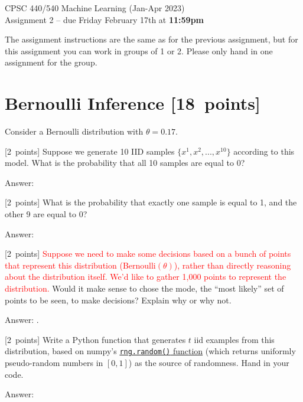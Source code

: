 \documentclass{article}
\newcommand{\ask}[1]{\textcolor{question}{#1}}
\newenvironment{answer}{\par\begingroup\color{answer}Answer: }{\endgroup}
\newcommand{\red}[1]{\textcolor{red}{#1}}
\newcommand{\pts}[1]{\textcolor{points}{[#1~points]}}
\newcommand{\TODO}{\color{red}{TODO}}
\begin{document}
\begin{center}
\Large
CPSC 440/540 Machine Learning (Jan-Apr 2023)\\
Assignment 2 --
due Friday February 17th at \textbf{11:59pm}
\end{center}


The assignment instructions are the same as for the previous assignment, but for this assignment you can work in groups of 1 or 2. Please only hand in one assignment for the group.


\section{Bernoulli Inference \pts{18}}

Consider a Bernoulli distribution with $\theta = 0.17$.
\begin{qlist}

\item \pts{2}
    Suppose we generate 10 IID samples $\{x^1,x^2,...,x^{10}\}$ according to this model.
    \ask{What is the probability that all 10 samples are equal to 0?}

\begin{answer}\TODO\end{answer}


\item \pts{2}
    \ask{What is the probability that exactly one sample is equal to 1, and the other 9 are equal to 0?}

\begin{answer}\TODO\end{answer}


\item \pts{2}
    \red{
    Suppose we need to make some decisions based on a bunch of points that represent this distribution (Bernoulli$(\theta)$), rather than directly reasoning about the distribution itself.
    We'd like to gather 1,000 points to represent the distribution.
    }
    \ask{Would it make sense to chose the mode, the ``most likely'' set of points to be seen, to make decisions? Explain why or why not.}

\begin{answer}\TODO\end{answer}.


\item \pts{2}
    Write a Python function that generates $t$ iid examples from this distribution,
    based on numpy's \href{https://numpy.org/doc/stable/reference/random/generated/numpy.random.Generator.random.html#numpy.random.Generator.random}{\texttt{rng.random()} function} (which returns uniformly pseudo-random numbers in $[0, 1]$) as the source of randomness.
    \ask{Hand in your code.}
\begin{answer}\TODO\end{answer}



\end{qlist}
\end{document}
